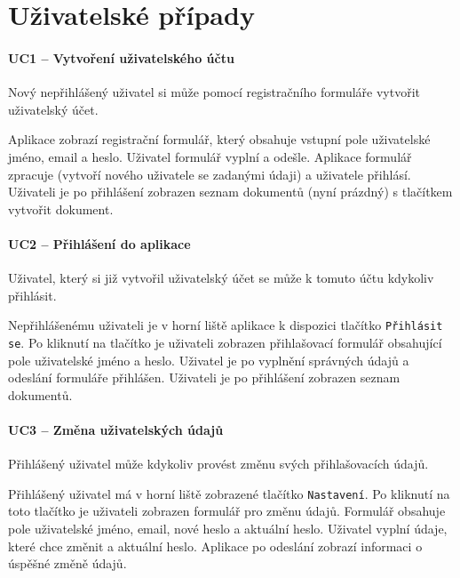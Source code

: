 
\section{Uživatelské případy}\label{sec:uzivatelskePripady}



\paragraph{UC1 -- Vytvoření uživatelského účtu}

Nový nepřihlášený uživatel si může pomocí registračního formuláře vytvořit uživatelský účet.

Aplikace zobrazí registrační formulář, který obsahuje vstupní pole uživatelské jméno, email a heslo.
Uživatel formulář vyplní a odešle.
Aplikace formulář zpracuje (vytvoří nového uživatele se zadanými údaji) a uživatele přihlásí.
Uživateli je po přihlášení zobrazen seznam dokumentů (nyní prázdný) s tlačítkem vytvořit dokument.

\paragraph{UC2 -- Přihlášení do aplikace}

Uživatel, který si již vytvořil uživatelský účet se může k tomuto účtu kdykoliv přihlásit.

Nepřihlášenému uživateli je v horní liště aplikace k dispozici tlačítko \texttt{Přihlásit se}.
Po kliknutí na tlačítko je uživateli zobrazen přihlašovací formulář obsahující pole uživatelské jméno a heslo.
Uživatel je po vyplnění správných údajů a odeslání formuláře přihlášen.
Uživateli je po přihlášení zobrazen seznam dokumentů.

\paragraph{UC3 -- Změna uživatelských údajů}

Přihlášený uživatel může kdykoliv provést změnu svých přihlašovacích údajů.

Přihlášený uživatel má v horní liště zobrazené tlačítko \texttt{Nastavení}.
Po kliknutí na toto tlačítko je uživateli zobrazen formulář pro změnu údajů.
Formulář obsahuje pole uživatelské jméno, email, nové heslo a aktuální heslo.
Uživatel vyplní údaje, které chce změnit a aktuální heslo.
Aplikace po odeslání zobrazí informaci o úspěšné změně údajů.

